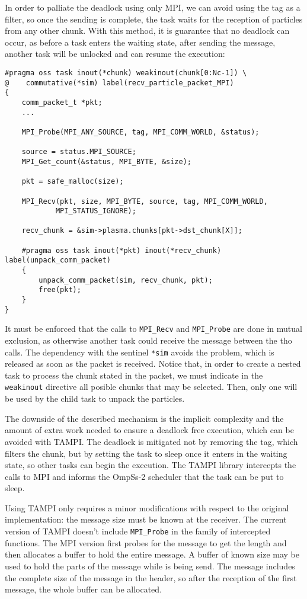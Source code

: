 In order to palliate the deadlock using only MPI, we can avoid using the tag as 
a filter, so once the sending is complete, the task waits for the reception of 
particles from any other chunk.  With this method, it is guarantee that no 
deadlock can occur, as before a task enters the waiting state, after sending the 
message, another task will be unlocked and can resume the execution:
%
\begin{lstlisting}
#pragma oss task inout(*chunk) weakinout(chunk[0:Nc-1]) \
@    commutative(*sim) label(recv_particle_packet_MPI)
{
	comm_packet_t *pkt;
	...

	MPI_Probe(MPI_ANY_SOURCE, tag, MPI_COMM_WORLD, &status);

	source = status.MPI_SOURCE;
	MPI_Get_count(&status, MPI_BYTE, &size);

	pkt = safe_malloc(size);

	MPI_Recv(pkt, size, MPI_BYTE, source, tag, MPI_COMM_WORLD,
			MPI_STATUS_IGNORE);

	recv_chunk = &sim->plasma.chunks[pkt->dst_chunk[X]];

	#pragma oss task inout(*pkt) inout(*recv_chunk) label(unpack_comm_packet)
	{
		unpack_comm_packet(sim, recv_chunk, pkt);
		free(pkt);
	}
}
\end{lstlisting}
%
It must be enforced that the calls to \texttt{MPI\_Recv} and \texttt{MPI\_Probe} 
are done in mutual exclusion, as otherwise another task could receive the 
message between the tho calls. The dependency with the sentinel \texttt{*sim} 
avoids the problem, which is released as soon as the packet is received. Notice 
that, in order to create a nested task to process the chunk stated in the 
packet, we must indicate in the \texttt{weakinout} directive all posible chunks 
that may be selected. Then, only one will be used by the child task to unpack 
the particles.

The downside of the described mechanism is the implicit complexity and the 
amount of extra work needed to ensure a deadlock free execution, which can be 
avoided with TAMPI. The deadlock is mitigated not by removing the tag, which 
filters the chunk, but by setting the task to sleep once it enters in the 
waiting state, so other tasks can begin the execution. The TAMPI library 
intercepts the calls to MPI and informs the OmpSs-2 scheduler that the task can 
be put to sleep.

Using TAMPI only requires a minor modifications with respect to the original 
implementation: the message size must be known at the receiver. The current 
version of TAMPI doesn't include \texttt{MPI\_Probe} in the family of 
intercepted functions. The MPI version first probes for the message to get the 
length and then allocates a buffer to hold the entire message. A buffer of known 
size may be used to hold the parts of the message while is being send. The 
message includes the complete size of the message in the header, so after the 
reception of the first message, the whole buffer can be allocated.

